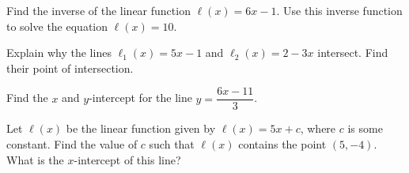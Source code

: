 \documentclass[11pt,letterpaper]{article}
\begin{document}

 Find the inverse of the linear function $\ell(x)= 6x - 1$. Use this inverse function to solve the equation $\ell(x)= 10$. 



\newpage



 Explain why the lines $\ell_1(x)= 5x - 1$ and $\ell_2(x)= 2 - 3x$ intersect. Find their point of intersection. 



\newpage

 

 Find the $x$ and $y$-intercept for the line $y= \dfrac{6x - 11}{3}$.



\newpage



 Let $\ell(x)$ be the linear function given by $\ell(x)= 5x + c$, where $c$ is some constant. Find the value of $c$ such that $\ell(x)$ contains the point $(5, -4)$. What is the $x$-intercept of this line?
\end{document}
